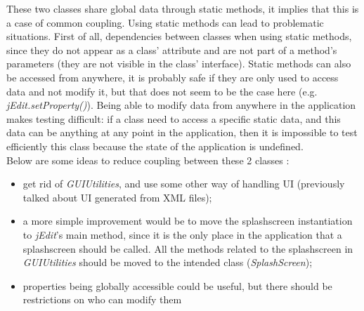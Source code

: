 These two classes share global data through static methods, it implies
that this is a case of common coupling. Using static methods can lead to
problematic situations. First of all, dependencies between classes when
using static methods, since they do not appear as a class' attribute and
are not part of a method's parameters (they are not visible in the
class' interface). Static methods can also be accessed from anywhere, it %
is probably safe if they are only used to access data and not modify it,
but that does not seem to be the case here (e.g.
\emph{jEdit.setProperty()}). Being able to modify data from anywhere in
the application makes testing difficult: if a class need to access a
specific static data, and this data can be anything at any point in the
application, then it is impossible to test efficiently this class
because the state of the application is undefined.\\ %

Below are some ideas to reduce coupling between these 2 classes :

\begin{itemize}\itemsep1pt
    \item get rid of \emph{GUIUtilities}, and use some other way of handling UI
    (previously talked about UI generated from XML files);

    \item a more simple improvement would be to move the splashscreen
    instantiation to \emph{jEdit}'s main method, since it is the only place in
    the application that a splashscreen should be called.
    All the methods related to the splashscreen in \emph{GUIUtilities} should be
    moved to the intended class (\emph{SplashScreen});

    \item properties being globally accessible could be useful, but there should
    be restrictions on who can modify them
\end{itemize}

\newpage
